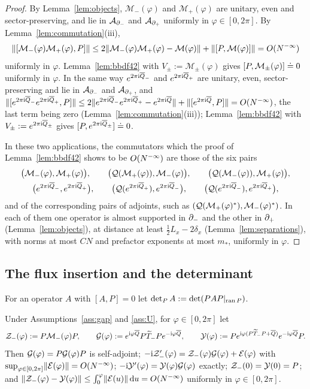 \begin{proof}
By Lemma~\ref{lem:objects}, $\mathcal M_-(\varphi)$ and $\mathcal M_+(\varphi)$ are unitary, even and sector-preserving, and lie in
$\mathcal{A}_{\partial_{-}}$ and $\mathcal{A}_{\partial_{+}}$ uniformly in $\varphi\in[0,2\pi]$. By Lemma~\ref{lem:commutation}(iii),
\[
\lVert[\mathcal M_-(\varphi)\mathcal M_+(\varphi),P]\rVert\le2\lVert\mathcal M_-(\varphi)\mathcal M_+(\varphi)-\mathcal M(\varphi)\rVert+\lVert[P,\mathcal M(\varphi)]\rVert=O(N^{-\infty})
\]
uniformly in $\varphi$. Lemma~\ref{lem:bbdf42} with $V_\pm:=\mathcal M_\pm(\varphi)$ gives $[P,\mathcal M_\pm(\varphi)]\doteq0$ uniformly in
$\varphi$. In the same way $e^{2\pi\mathrm{i}\overline{Q}_-}$ and $e^{2\pi\mathrm{i}\overline{Q}_+}$ are unitary, even, sector-preserving and lie in $\mathcal{A}_{\partial_{-}}$
and $\mathcal{A}_{\partial_{+}}$, and
$\lVert[e^{2\pi\mathrm{i}\overline{Q}_-}e^{2\pi\mathrm{i}\overline{Q}_+},P]\rVert\le2\lVert e^{2\pi\mathrm{i}\overline{Q}_-}e^{2\pi\mathrm{i}\overline{Q}_+}-e^{2\pi\mathrm{i}\overline{Q}}\rVert+\lVert[e^{2\pi\mathrm{i}\overline{Q}},P]\rVert=O(N^{-\infty})$, the
last term being zero (Lemma~\ref{lem:commutation}(iii)); Lemma~\ref{lem:bbdf42} with $V_\pm:=e^{2\pi\mathrm{i}\overline{Q}_\pm}$ gives
$[P,e^{2\pi\mathrm{i}\overline{Q}_\pm}]\doteq0$.

In these two applications, the commutators which the proof of Lemma~\ref{lem:bbdf42} shows to be $O(N^{-\infty})$ are those of
the six pairs
\begin{gather*}
\bigl(\mathcal M_-(\varphi),\mathcal M_+(\varphi)\bigr),\qquad\bigl(\mathcal{Q}(\mathcal M_+(\varphi)),\mathcal M_-(\varphi)\bigr),\qquad\bigl(\mathcal{Q}(\mathcal M_-(\varphi)),\mathcal M_+(\varphi)\bigr),\\
\bigl(e^{2\pi\mathrm{i}\overline{Q}_-},e^{2\pi\mathrm{i}\overline{Q}_+}\bigr),\qquad\bigl(\mathcal{Q}(e^{2\pi\mathrm{i}\overline{Q}_+}),e^{2\pi\mathrm{i}\overline{Q}_-}\bigr),\qquad
\bigl(\mathcal{Q}(e^{2\pi\mathrm{i}\overline{Q}_-}),e^{2\pi\mathrm{i}\overline{Q}_+}\bigr),
\end{gather*}
and of the corresponding pairs of adjoints, such as $(\mathcal{Q}(\mathcal M_+(\varphi)^*),\mathcal M_-(\varphi)^*)$. In each of them one operator is
almost supported in $\partial_{-}$ and the other in $\partial_{+}$ (Lemma~\ref{lem:objects}), at distance at least $\frac12L_x-2\delta_x$
(Lemma~\ref{lem:separations}), with norms at most $CN$ and prefactor exponents at most $m_*$, uniformly in $\varphi$.
\end{proof}

\subsection{The flux insertion and the determinant}

For an operator $A$ with $[A,P]=0$ let $\det\nolimits_{P} A:=\det(PAP|_{\operatorname{ran} P})$.

\begin{lemma}\label{lem:ode}
Under Assumptions~\ref{ass:gap} and \ref{ass:U}, for $\varphi\in[0,2\pi]$ let
\[
\mathcal{Z}_{-}(\varphi):=P\mathcal M_-(\varphi)P,\qquad\mathcal{G}(\varphi):=e^{\mathrm{i}\varphi\overline{Q}}P\widetilde{T}_{-} Pe^{-\mathrm{i}\varphi\overline{Q}},\qquad
\mathcal{Y}(\varphi):=Pe^{\mathrm{i}\varphi(P\widetilde{T}_{-} P+\overline{Q})}e^{-\mathrm{i}\varphi\overline{Q}}P .
\]
Then $\mathcal{G}(\varphi)=P\mathcal{G}(\varphi)P$ is self-adjoint; $-\mathrm{i}\mathcal{Z}_{-}'(\varphi)=\mathcal{Z}_{-}(\varphi)\mathcal{G}(\varphi)+\mathcal{E}(\varphi)$ with
$\sup_{\varphi\in[0,2\pi]}\lVert\mathcal{E}(\varphi)\rVert=O(N^{-\infty})$; $-\mathrm{i}\mathcal{Y}'(\varphi)=\mathcal{Y}(\varphi)\mathcal{G}(\varphi)$ exactly;
$\mathcal{Z}_{-}(0)=\mathcal{Y}(0)=P$; and $\lVert\mathcal{Z}_{-}(\varphi)-\mathcal{Y}(\varphi)\rVert\le\int_0^\varphi\lVert\mathcal{E}(u)\rVert\,\mathrm{d} u=O(N^{-\infty})$ uniformly in
$\varphi\in[0,2\pi]$.
\end{lemma}

